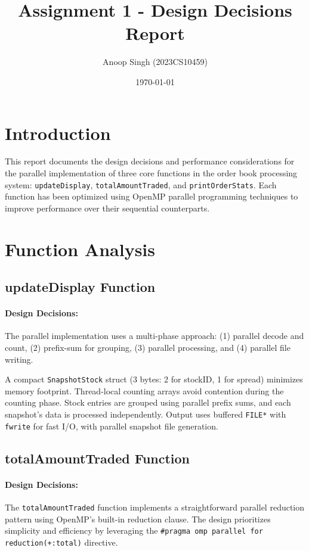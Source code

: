\documentclass[11pt]{article}
\title{Assignment 1 - Design Decisions Report}
\author{Anoop Singh (2023CS10459)}
\date{\today}
\begin{document}
\maketitle

\section{Introduction}

This report documents the design decisions and performance considerations for the parallel implementation of three core functions in the order book processing system: \texttt{updateDisplay}, \texttt{totalAmountTraded}, and \texttt{printOrderStats}. Each function has been optimized using OpenMP parallel programming techniques to improve performance over their sequential counterparts.

\section{Function Analysis}

\subsection{updateDisplay Function}

\paragraph{Design Decisions:}
The parallel implementation uses a multi-phase approach: (1) parallel decode and count, (2) prefix-sum for grouping, (3) parallel processing, and (4) parallel file writing.

A compact \texttt{SnapshotStock} struct (3 bytes: 2 for stockID, 1 for spread) minimizes memory footprint. Thread-local counting arrays avoid contention during the counting phase. Stock entries are grouped using parallel prefix sums, and each snapshot's data is processed independently. Output uses buffered \texttt{FILE*} with \texttt{fwrite} for fast I/O, with parallel snapshot file generation.

\subsection{totalAmountTraded Function}

\paragraph{Design Decisions:}
The \texttt{totalAmountTraded} function implements a straightforward parallel reduction pattern using OpenMP's built-in reduction clause. The design prioritizes simplicity and efficiency by leveraging the \texttt{\#pragma omp parallel for reduction(+:total)} directive.
\end{document}
